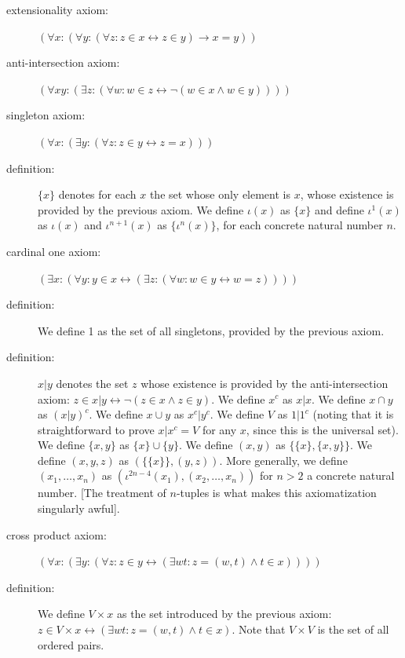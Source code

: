 \documentclass{article}
\theoremstyle{definition}
\theoremstyle{remark}
\begin{document}
{\begin{description}

\item[extensionality axiom:]  $(\forall x:(\forall y:(\forall z:z \in x \leftrightarrow z \in y)\rightarrow x=y))$

\item[anti-intersection axiom:]  $(\forall xy:(\exists z:(\forall w:w \in z \leftrightarrow \neg(w \in x \wedge w \in y))))$

\item[singleton axiom:]  $(\forall x:(\exists y:(\forall z:z \in y \leftrightarrow z = x)))$

\item[definition:]  $\{x\}$ denotes for each $x$ the set whose only element is $x$, whose existence is provided by the previous axiom.  We define $\iota(x)$ as $\{x\}$ and define $\iota^1(x)$ as $\iota(x)$ and $\iota^{n+1}(x)$ as $\{\iota^n(x)\}$, for each concrete natural number $n$.

\item[cardinal one axiom:] $(\exists x:(\forall y:y \in x \leftrightarrow (\exists z:(\forall w:w \in y \leftrightarrow w = z))))$

\item[definition:]  We define 1 as the set of all singletons, provided by the previous axiom.

\item[definition:]   $x | y$ denotes the set $z$ whose existence is provided by the anti-intersection axiom:  $z \in x | y \leftrightarrow \neg(z \in x \wedge z \in y)$.
We define $x^c$ as $x | x$.  We define $x \cap y$ as $(x|y)^c$.  We define $x \cup y$ as $x^c | y^c$.  We define $V$ as $1|1^c$ (noting that it is straightforward to prove $x|x^c = V$ for any $x$, since this is the universal set).  We define $\{x,y\}$ as $\{x\} \cup \{y\}$.  We define $(x,y)$ as $\{\{x\},\{x,y\}\}$.  We define
$(x,y,z)$ as $(\{\{x\}\},(y,z))$.   More generally, we define $(x_1,\ldots,x_n)$ as $(\iota^{2n-4}(x_1),(x_2,\ldots,x_n))$ for $n>2$ a concrete natural number. [The treatment of $n$-tuples is what makes this axiomatization singularly awful].

\item[cross product axiom:]  $(\forall x:(\exists y:(\forall z:z \in y \leftrightarrow (\exists wt:z = (w,t) \wedge t \in x))))$

\item[definition:]  We define $V \times x$ as the set introduced by the previous axiom:  $z \in V  \times x \leftrightarrow (\exists wt:z = (w,t) \wedge t \in x)$.  Note that $V \times V$ is the set of all ordered pairs.






\end{description}}
\end{document}
